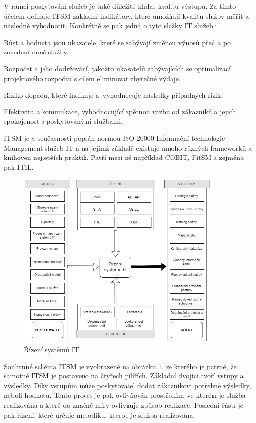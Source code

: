 \documentclass[
  digital,     %
  twoside,     %
  lof,         %
  lot,         %
]{fithesis4}
\begin{document}
V rámci poskytování služeb je také důležité hlídat kvalitu výstupů. Za tímto účelem definuje ITSM základní indikátory, které umožňují kvalitu služby měřit a následně vyhodnotit. Konkrétně se pak jedná o tyto složky IT služeb \parencite[s.~20]{Matula2017}:
\begin{compactitem}
\item Růst a hodnota jsou ukazatele, které se zabývají změnou výnosů před a po zavedení dané služby.
\item Rozpočet a jeho dodržování, jakožto ukazatelů zabývajících se optimalizací projektového rozpočtu s cílem eliminovat zbytečné výdaje.
\item Riziko dopadu, které indikuje a vyhodnocuje následky případných rizik.
\item Efektivita a komunikace, vyhodnocující zpětnou vazbu od zákazníků a jejich spokojenost s poskytovanými službami.
\end{compactitem}

ITSM je v současnosti popsán normou ISO 20000 Informační technologie - Management služeb IT a na jejímž základě existuje mnoho různých frameworků a knihoven nejlepších praktik. Patří mezi ně například COBIT, FitSM a zejména pak ITIL.\parencite[s.~25]{Matula2017}

\begin{figure}[h]
  \begin{center}
          \includegraphics[width=10cm]{img/itsm-diag.drawio.png}
  \end{center}
  \caption{Řízení systémů IT \parencite[s.~21]{Matula2017}}
  \label{fig:itsmDiag}
\end{figure} 

Souhrnné schéma ITSM je vyobrazené na obrázku \ref{fig:itsmDiag}, ze kterého je patrné, že samotné ITSM je postaveno na čtyřech pilířích. Základní dvojici tvoří vstupy a výsledky. Díky vstupům může poskytovatel dodat zákazníkovi potřebné výsledky, neboli hodnotu. Tento proces je pak ovlivňován prostředím, ve kterém je služba realizována a které do značné míry ovlivňuje způsob realizace. Poslední částí je pak řízení, které určuje metodiku, kterou je služba realizována. 
\end{document}
